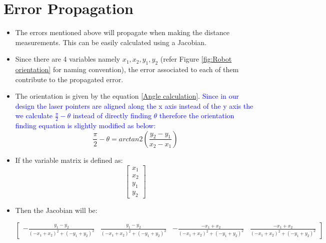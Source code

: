     \section{Error Propagation}
    {
        \begin{itemize}
            \item The errors mentioned above will propagate when making the distance measurements. This can be easily calculated using a Jacobian.
            
            \item Since there are 4 variables namely $x_1,x_2,y_1,y_2$ (refer Figure \ref{fig:Robot orientation} for naming convention), the error associated to each of them contribute to the propagated error.
            
            \item The orientation is given by the equation \ref{Angle calculation}. \textcolor{blue}{Since in our design the laser pointers are aligned along the x axis instead of the y axis the we calculate  $\frac{\pi}{2}-\theta$ instead of directly finding $\theta$ therefore the orientation finding equation is slightly modified as below:}
            \begin{equation}\label{Angle calculation}
                \frac{\pi}{2}-\theta=arctan2(\frac{y_2-y_1}{x_2-x_1})
            \end{equation}
            
            \item If the variable matrix is defined as:
            \begin{equation}\label{Variable Matrix}
                \begin{bmatrix}x_{1}\\x_{2}\\y_{1}\\y_{2}\end{bmatrix}
            \end{equation}
            
            \item Then the Jacobian will be:
          
            
            
           $$ \begin{bmatrix}\label{Jacobian}- \frac{y_{1} - y_{2}}{\left(- x_{1} + x_{2}\right)^{2} + \left(- y_{1} + y_{2}\right)^{2}} & \frac{y_{1} - y_{2}}{\left(- x_{1} + x_{2}\right)^{2} + \left(- y_{1} + y_{2}\right)^{2}} & - \frac{- x_{1} + x_{2}}{\left(- x_{1} + x_{2}\right)^{2} + \left(- y_{1} + y_{2}\right)^{2}} & \frac{- x_{1} + x_{2}}{\left(- x_{1} + x_{2}\right)^{2} + \left(- y_{1} + y_{2}\right)^{2}}\end{bmatrix}
           $$
           

\end{itemize}}
